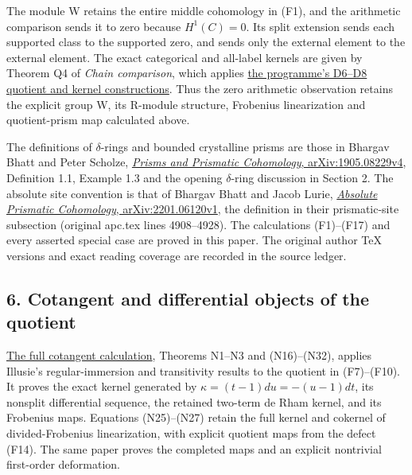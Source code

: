 \documentclass[
]{article}
\begin{document}
The module W retains the entire middle cohomology in (F1), and the
arithmetic comparison sends it to zero because \(H^1(C)=0\). Its split
extension sends each supported class to the supported zero, and sends
only the external element to the external element. The exact categorical
and all-label kernels are given by Theorem Q4 of \emph{Chain
comparison}, which applies
\href{https://github.com/KokunoYumeto/zeta-function-research-reader/blob/39ced92952a9c807d51500783b221beb141da3b6/workbenches/splitzero-tandem/tex/support_diagrams.tex\#L125}{the
programme's D6--D8 quotient and kernel constructions}. Thus the zero
arithmetic observation retains the explicit group W, its R-module
structure, Frobenius linearization and quotient-prism map calculated
above.

The definitions of \(\delta\)-rings and bounded crystalline prisms are
those in Bhargav Bhatt and Peter Scholze,
\href{https://arxiv.org/abs/1905.08229v4}{\emph{Prisms and Prismatic
Cohomology}, arXiv:1905.08229v4}, Definition 1.1, Example 1.3 and the
opening \(\delta\)-ring discussion in Section 2. The absolute site
convention is that of Bhargav Bhatt and Jacob Lurie,
\href{https://arxiv.org/abs/2201.06120v1}{\emph{Absolute Prismatic
Cohomology}, arXiv:2201.06120v1}, the definition in their prismatic-site
subsection (original apc.tex lines 4908--4928). The calculations
(F1)--(F17) and every asserted special case are proved in this paper.
The original author TeX versions and exact reading coverage are recorded
in the source ledger.

\subsection{6. Cotangent and differential objects of the
quotient}\label{cotangent-and-differential-objects-of-the-quotient}

\href{https://github.com/KokunoYumeto/zeta-function-research-reader/blob/6af54ea3c8ef99127af327f3103e086c68d482c2/workbenches/splitzero-tandem/branches/identity-absorber-square/NODE_COTANGENT.md}{The
full cotangent calculation}, Theorems N1--N3 and (N16)--(N32), applies
Illusie's regular-immersion and transitivity results to the quotient in
(F7)--(F10). It proves the exact kernel generated by
\(\kappa=(t-1)du=-(u-1)dt\), its nonsplit differential sequence, the
retained two-term de Rham kernel, and its Frobenius maps. Equations
(N25)--(N27) retain the full kernel and cokernel of divided-Frobenius
linearization, with explicit quotient maps from the defect (F14). The
same paper proves the completed maps and an explicit nontrivial
first-order deformation.
\end{document}
